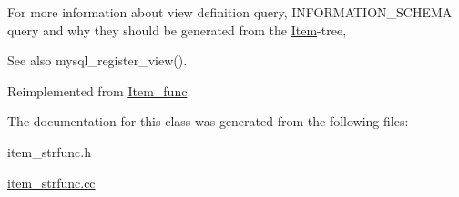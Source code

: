 For more information about view definition query, I\+N\+F\+O\+R\+M\+A\+T\+I\+O\+N\+\_\+\+S\+C\+H\+E\+MA query and why they should be generated from the \mbox{\hyperlink{classItem}{Item}}-\/tree, \begin{DoxySeeAlso}{See also}
mysql\+\_\+register\+\_\+view(). 
\end{DoxySeeAlso}


Reimplemented from \mbox{\hyperlink{classItem__func_afb302ee25d4721ace27d3f5053d4ee41}{Item\+\_\+func}}.



The documentation for this class was generated from the following files\+:\begin{DoxyCompactItemize}
\item 
item\+\_\+strfunc.\+h\item 
\mbox{\hyperlink{item__strfunc_8cc}{item\+\_\+strfunc.\+cc}}\end{DoxyCompactItemize}
